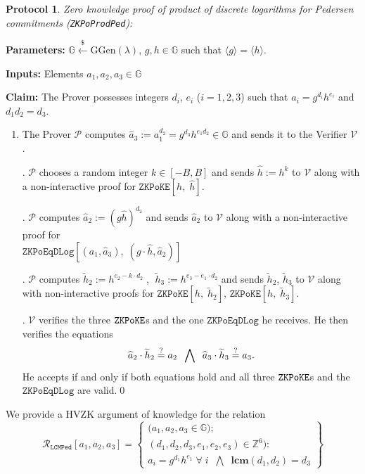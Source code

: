 \documentclass[11pt, lettersize, notitlepage, leqno, footskip=0.6cm]{article}
\newcommand{\ttt}{\texttt}
\newcommand{\bG}{\mathbb{G}}
\newcommand{\la}{\langle}
\newcommand{\ra}{\rangle}
\newcommand{\wti}{\widetilde}
\newcommand{\mc}{\mathcal}
\newcommand{\mb}{\mathbb}
\newcommand{\mbf}{\mathbf}
\newcommand{\mr}{\mathrm}
\newcommand{\lamb}{\lambda}
\newcommand{\what}{\widehat}
\newcommand{\mP}{\mc{P}}
\newcommand{\V}{\mc{V}}
\newcommand{\vs}{\vspace{-0.15cm}}
\newcommand{\noin}{\noindent}
\newcommand{\sta}{\stackrel{?}{=}}
\newcommand{\LCM}{\mbf{lcm}}
\newtheorem{Prot}[Thm]{Protocol}
\numberwithin{equation}{section}
\begin{document}
{{{\begin{Prot} \normalfont \hypertarget{PoProdPed}{\textit{Zero knowledge proof of product of discrete logarithms for Pedersen commitments}} (\verb|ZKPoProdPed|):\end{Prot} \vspace{-0.3cm}

\noin \textbf{Parameters:} $\mb{G}\xleftarrow{\$} \mr{GGen}(\lamb)$,  $g,h\in \mb{G}$ such that $\la g \ra = \la h \ra$.

\noin \textbf{Inputs:} Elements $a_1,a_2,a_3\in \mb{G}$

\noin \textbf{Claim:} The Prover possesses integers $d_i$, $e_i$ ($i=1,2,3$) such that $a_i = g^{d_i}h^{e_i}$ and $d_1d_2 = d_3$.

\begin{enumerate}[wide, labelwidth=!, labelindent=0pt]\vs \item The Prover $\mP$ computes $\what{a}_3:= a_1^{d_2} = g^{d_3}h^{e_1d_2}\in \bG$ and sends it to the Verifier $\V$.

\noin 2. $\mP$ chooses a random integer $k\in [-B, B]$ and sends $\what{h}:= h^k$ to $\V$ along with a non-interactive proof for $\ttt{ZKPoKE}[h,\;\what{h}]$.

\noin 3. $\mP$ computes $\what{a}_2:= (g\what{h})^{d_2}$ and sends $\what{a}_2$ to $\V$ along with a non-interactive proof for\\ $\ttt{ZKPoEqDLog}[(a_1,\what{a}_3),\;(g\cdot\what{h}, \what{a}_2)]$

\noin 4. $\mP$ computes $\wti{h}_2:= h^{e_2-k\cdot d_2}\;$, $\;\wti{h}_3:= h^{e_3-e_1\cdot d_2}$ and sends $\wti{h}_2$, $\wti{h}_3$ to $\V$ along with non-interactive proofs for $\ttt{ZKPoKE}[h,\;\wti{h}_2 ]$, $\ttt{ZKPoKE}[h,\;\wti{h}_3 ]$.

\noin 5. $\V$ verifies the three $\tt{ZKPoKE}$s and the one $\ttt{ZKPoEqDLog}$ he receives. He then verifies the equations \vs $$ \what{a}_2\cdot \wti{h}_2 \sta a_2\;\;\bigwedge\;\;\what{a}_3\cdot \wti{h}_3 \sta a_3. \vs $$ He accepts if and only if both equations hold and all three $\tt{ZKPoKE}$s and the $\ttt{ZKPoEqDLog}$ are valid.\qed \end{enumerate}


We provide a HVZK argument of knowledge for the relation \[
  \mc{R}_{{\ttt{LCMPed}}}[a_1,a_2,a_3] = \left\{\begin{array}{l}
    \big(a_1,a_2,a_3\in\mb{G} \big);\\
    (d_1, d_2,d_3, e_1,e_2,e_3)\in\mb{Z}^6): \\
    a_i = g^{d_1}h^{e_1}\;\forall\;i\;\; \bigwedge\;\; \LCM(d_1,d_2) = d_3   \end{array}\right\}
\] 


}}}
\end{document}
